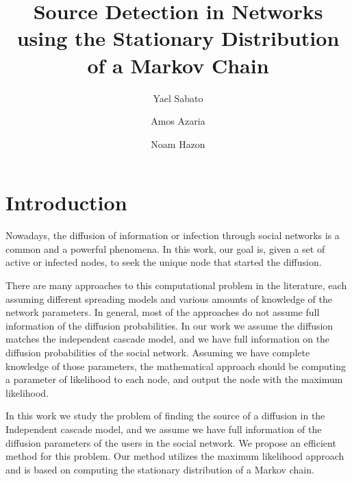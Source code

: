 \documentclass[sigconf,anonymous]{aamas}
\title[AAMAS-2023 Formatting Instructions]{Source Detection in Networks using the Stationary Distribution of a Markov Chain}
\author{Yael Sabato}
\affiliation{
  \institution{Computer Science Department }
  \city{Ariel University}
  \country{Israel}}
\author{Amos Azaria}
\affiliation{
  \institution{Data Science Center, Computer Science Department}
  \city{Ariel University}
  \country{Israel}}
\author{Noam Hazon}
\affiliation{
  \institution{Computer Science Department}
  \city{Ariel University}
  \country{Israel}}
\begin{document}

\pagestyle{fancy}
\fancyhead{}


\maketitle 


\section{Introduction}

Nowadays, the diffusion of information or infection through social networks is a common %
and a powerful phenomena. In this work, our goal is, given a set of active or infected nodes, to seek the unique node that started the diffusion.

There are many approaches to this computational problem in the literature, each assuming different spreading models and various amounts of knowledge of the network parameters. In general, most of the  approaches do not assume full information of the diffusion probabilities. In our work we assume the diffusion matches the independent cascade model, and we have full information on the diffusion probabilities of the social network.
Assuming we have complete knowledge of those parameters, the mathematical approach should be computing a parameter of likelihood to each node, and output the node with the maximum likelihood.


In this work we study the problem of finding the source of a diffusion in the Independent cascade model, and we assume we have full information of the diffusion parameters of the users in the social network.
We propose an efficient method for this problem. Our method utilizes the maximum likelihood approach and is based on computing the stationary distribution of a Markov chain.
\end{document}
